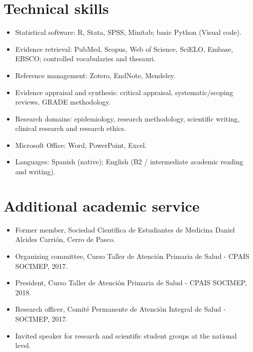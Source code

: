 \documentclass[11pt,a4paper]{article}
\begin{document}
\section*{Technical skills}
\begin{itemize}[leftmargin=*,itemsep=4pt]
\item Statistical software: R, Stata, SPSS, Minitab; basic Python (Visual code).
\item Evidence retrieval: PubMed, Scopus, Web of Science, SciELO, Embase, EBSCO; controlled vocabularies and thesauri.
\item Reference management: Zotero, EndNote, Mendeley.
\item Evidence appraisal and synthesis: critical appraisal, systematic/scoping reviews, GRADE methodology.
\item Research domains: epidemiology, research methodology, scientific writing, clinical research and research ethics.
\item Microsoft Office: Word, PowerPoint, Excel.
\item Languages: Spanish (native); English (B2 / intermediate academic reading and writing).
\end{itemize}
\section*{Additional academic service}
\begin{itemize}[leftmargin=*,itemsep=4pt]
\item Former member, Sociedad Científica de Estudiantes de Medicina Daniel Alcides Carrión, Cerro de Pasco.
\item Organizing committee, Curso Taller de Atención Primaria de Salud - CPAIS SOCIMEP, 2017.
\item President, Curso Taller de Atención Primaria de Salud - CPAIS SOCIMEP, 2018.
\item Research officer, Comité Permanente de Atención Integral de Salud - SOCIMEP, 2017.
\item Invited speaker for research and scientific student groups at the national level.
\end{itemize}
\end{document}
